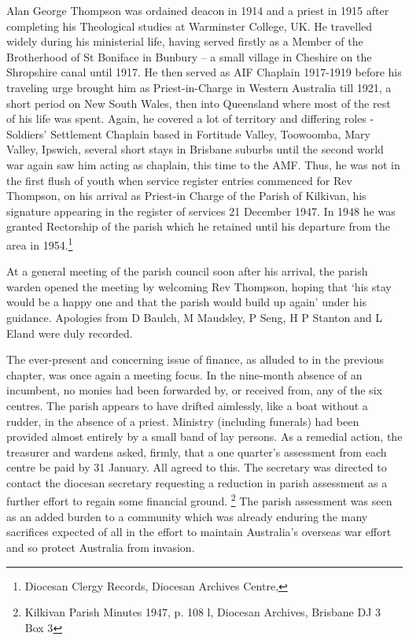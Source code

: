 Alan George Thompson was ordained deacon in 1914 and a priest in 1915 after completing his Theological studies at Warminster College, UK. He travelled widely during his ministerial life, having served firstly as a Member of the Brotherhood of St Boniface in Bunbury -- a small village in Cheshire on the Shropshire canal until 1917. He then served as AIF Chaplain 1917-1919 before his traveling urge brought him as Priest-in-Charge in Western Australia till 1921, a short period on New South Wales, then into Queensland where most of the rest of his life was spent. Again, he covered a lot of territory and differing roles - Soldiers' Settlement Chaplain based in Fortitude Valley, Toowoomba, Mary Valley, Ipswich, several short stays in Brisbane suburbs until the second world war again saw him acting as chaplain, this time to the AMF. Thus, he was not in the first flush of youth when service register entries commenced for Rev Thompson, on his arrival as Priest-in Charge of the Parish of Kilkivan, his signature appearing in the register of services 21 December 1947. In 1948 he was granted Rectorship of the parish which he retained until his departure from the area in 1954.\footnote{Diocesan Clergy Records, Diocesan Archives Centre,}

At a general meeting of the parish council soon after his arrival, the parish warden opened the meeting by welcoming Rev Thompson, hoping that `his stay would be a happy one and that the parish would build up again' under his guidance. Apologies from D Baulch, M Maudsley, P Seng, H P Stanton and L Eland were duly recorded.

The ever-present and concerning issue of finance, as alluded to in the previous chapter, was once again a meeting focus. In the nine-month absence of an incumbent, no monies had been forwarded by, or received from, any of the six centres. The parish appears to have drifted aimlessly, like a boat without a rudder, in the absence of a priest. Ministry (including funerals) had been provided almost entirely by a small band of lay persons. As a remedial action, the treasurer and wardens asked, firmly, that a one quarter's assessment from each centre be paid by 31 January. All agreed to this. The secretary was directed to contact the diocesan secretary requesting a reduction in parish assessment as a further effort to regain some financial ground. \footnote{Kilkivan Parish Minutes 1947, p. 108 l, Diocesan Archives, Brisbane DJ 3 Box 3} The parish assessment was seen as an added burden to a community which was already enduring the many sacrifices expected of all in the effort to maintain Australia's overseas war effort and so protect Australia from invasion.


